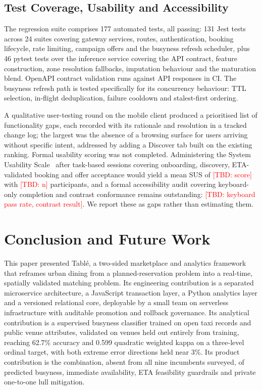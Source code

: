 \documentclass[conference]{IEEEtran}
\newcommand{\tbd}[1]{\textcolor{red}{[TBD: #1]}}
\begin{document}
\subsection{Test Coverage, Usability and Accessibility}

The regression suite comprises 177 automated tests, all passing: 131 Jest tests across 24 suites covering gateway services, routes, authentication, booking lifecycle, rate limiting, campaign offers and the busyness refresh scheduler, plus 46 pytest tests over the inference service covering the API contract, feature construction, zone resolution fallbacks, imputation behaviour and the maturation blend. OpenAPI contract validation runs against API responses in CI. The busyness refresh path is tested specifically for its concurrency behaviour: TTL selection, in-flight deduplication, failure cooldown and stalest-first ordering.

A qualitative user-testing round on the mobile client produced a prioritised list of functionality gaps, each recorded with its rationale and resolution in a tracked change log; the largest was the absence of a browsing surface for users arriving without specific intent, addressed by adding a Discover tab built on the existing ranking. Formal usability scoring was not completed. Administering the System Usability Scale~\cite{b8} after task-based sessions covering onboarding, discovery, ETA-validated booking and offer acceptance would yield a mean SUS of \tbd{score} with \tbd{n} participants, and a formal accessibility audit covering keyboard-only completion and contrast conformance remains outstanding: \tbd{keyboard pass rate, contrast result}. We report these as gaps rather than estimating them.

\section{Conclusion and Future Work}

This paper presented Tabl\'{e}, a two-sided marketplace and analytics framework that reframes urban dining from a planned-reservation problem into a real-time, spatially validated matching problem. Its engineering contribution is a separated microservice architecture, a JavaScript transaction layer, a Python analytics layer and a versioned relational core, deployable by a small team on serverless infrastructure with auditable promotion and rollback governance. Its analytical contribution is a supervised busyness classifier trained on open taxi records and public venue attributes, validated on venues held out entirely from training, reaching 62.7\% accuracy and 0.599 quadratic weighted kappa on a three-level ordinal target, with both extreme error directions held near 3\%. Its product contribution is the combination, absent from all nine incumbents surveyed, of predicted busyness, immediate availability, ETA feasibility guardrails and private one-to-one lull mitigation.
\end{document}
